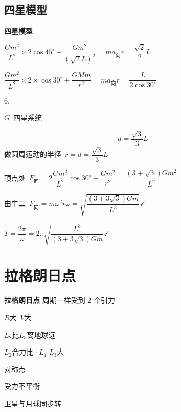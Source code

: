 \subsection{四星模型}
\textbf{四星模型}


$\dfrac{Gm^{2}}{L^{2}}\times2\cos45^{\circ}+\dfrac{Gm^{2}}{(\sqrt{2}L)^{2}}=ma_{\text{向}}$\qquad $r=\dfrac{\sqrt{2}}{2}L$


$\dfrac{Gm^{2}}{L^{2}}\times2\times\cos30^{\circ}+\dfrac{GMm}{r^{2}}=ma_{\text{向}}$\qquad $r=\dfrac{L}{2\cos30^{\circ}}$

6.

\begin{problem}
$G$\ 四星系统
\begin{solution}
\[
d=\frac{\sqrt3}{3}L
\]
做圆周运动的半径\ $r=d=\dfrac{\sqrt3}{3}L$

顶点处\ $F_{\text{向}}=2\dfrac{Gm^2}{L^2}\cos30^\circ+\dfrac{Gm^2}{r^2}=\dfrac{(3+\sqrt3)Gm^2}{L^2}$

由牛二\ $F_{\text{向}}=m\omega^2r$\quad $\omega=\sqrt{\dfrac{(3+3\sqrt3)Gm}{L^3}}$\quad $\checkmark$

$T=\dfrac{2\pi}{\omega}=2\pi\sqrt{\dfrac{L^3}{(3+3\sqrt3)Gm}}$\quad $\checkmark$
\end{solution}
\end{problem}


\section{拉格朗日点}
\textbf{拉格朗日点}
周期一样\qquad 受到 2 个引力 %

$R$大\ $V$大

$L_2$比$L_3$离地球远

$L_2$合力比·$L_1$ $L_3$大

对称点 %

受力不平衡

卫星与月球同步转\quad {} %

